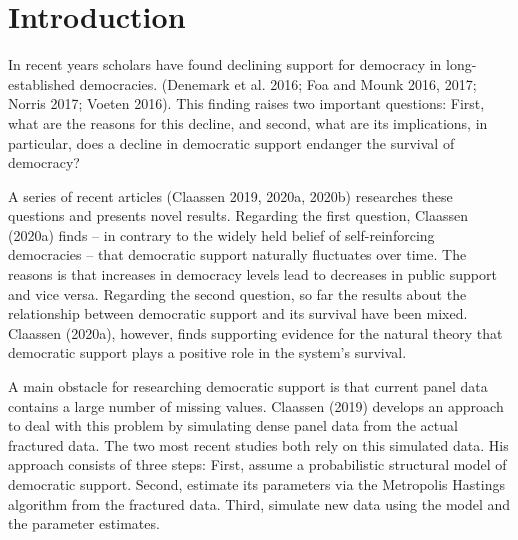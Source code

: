 \documentclass[12pt,english,a4paper,oneside]{article}
\theoremstyle{definition}
\theoremstyle{definition}
\theoremstyle{definition}
\theoremstyle{definition}
\theoremstyle{remark}
\begin{document}
\newpage







{
\setcounter{tocdepth}{2}
\newpage
{}
\tableofcontents
}

\newpage
{}
\pagestyle{plain}
\hypertarget{introduction}{%
\section{Introduction}\label{introduction}}

In recent years scholars have found declining support for democracy in long-established democracies. (Denemark et al. 2016; Foa and Mounk 2016, 2017; Norris 2017; Voeten 2016). This finding raises two important questions: First, what are the reasons for this decline, and second, what are its implications, in particular, does a decline in democratic support endanger the survival of democracy?

A series of recent articles (Claassen 2019, 2020a, 2020b) researches these questions and presents novel results. Regarding the first question, Claassen (2020a) finds -- in contrary to the widely held belief of self-reinforcing democracies -- that democratic support naturally fluctuates over time. The reasons is that increases in democracy levels lead to decreases in public support and vice versa. Regarding the second question, so far the results about the relationship between democratic support and its survival have been mixed. Claassen (2020a), however, finds supporting evidence for the natural theory that democratic support plays a positive role in the system's survival.

A main obstacle for researching democratic support is that current panel data contains a large number of missing values. Claassen (2019) develops an approach to deal with this problem by simulating dense panel data from the actual fractured data. The two most recent studies both rely on this simulated data. His approach consists of three steps: First, assume a probabilistic structural model of democratic support. Second, estimate its parameters via the Metropolis Hastings algorithm from the fractured data. Third, simulate new data using the model and the parameter estimates.
\end{document}
